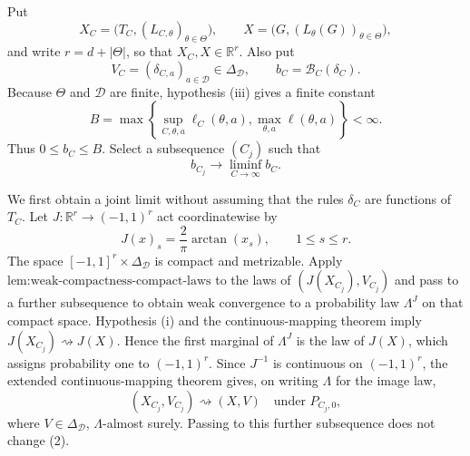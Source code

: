 Put
\[
 X_C=\bigl(T_C,(L_{C,\theta})_{\theta\in\Theta}\bigr),
 \qquad
 X=\bigl(G,(L_\theta(G))_{\theta\in\Theta}\bigr),
\]
and write \(r=d+|\Theta|\), so that \(X_C,X\in\mathbb R^r\).  Also put
\[
 V_C=(\delta_{C,a})_{a\in\mathcal D}\in\Delta_{\mathcal D},
 \qquad
 b_C=\mathcal B_C(\delta_C).
\]
Because \(\Theta\) and \(\mathcal D\) are finite, hypothesis (iii) gives a finite constant
\[
 B=\max\left\{
       \sup_{C,\theta,a}\ell_C(\theta,a),
       \max_{\theta,a}\ell(\theta,a)
     \right\}<\infty.
 \tag{1}
\]
Thus \(0\leq b_C\leq B\).  Select a subsequence \((C_j)\) such that
\[
 b_{C_j}\longrightarrow\liminf_{C\to\infty}b_C.
 \tag{2}
\]

We first obtain a joint limit without assuming that the rules \(\delta_C\) are functions of \(T_C\).  Let \(J\colon\mathbb R^r\to(-1,1)^r\) act coordinatewise by
\[
 J(x)_s=\frac{2}{\pi}\arctan(x_s),\qquad 1\leq s\leq r.
\]
The space \([-1,1]^r\times\Delta_{\mathcal D}\) is compact and metrizable.  Apply \(\text{lem:weak-compactness-compact-laws}\) to the laws of \((J(X_{C_j}),V_{C_j})\) and pass to a further subsequence to obtain weak convergence to a probability law \(\Lambda^J\) on that compact space.  Hypothesis (i) and the continuous-mapping theorem imply \(J(X_{C_j})\rightsquigarrow J(X)\).  Hence the first marginal of \(\Lambda^J\) is the law of \(J(X)\), which assigns probability one to \((-1,1)^r\).  Since \(J^{-1}\) is continuous on \((-1,1)^r\), the extended continuous-mapping theorem gives, on writing \(\Lambda\) for the image law,
\[
 (X_{C_j},V_{C_j})\rightsquigarrow(X,V)
 \quad\text{under }P_{C_j,0},
 \tag{3}
\]
where \(V\in\Delta_{\mathcal D}\), \(\Lambda\)-almost surely.  Passing to this further subsequence does not change (2).

